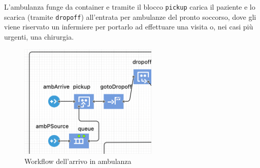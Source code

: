 L’ambulanza funge da container e  tramite il blocco \texttt{pickup} carica il paziente e lo scarica (tramite \texttt{dropoff}) all’entrata per ambulanze del pronto soccorso, dove gli viene riservato un infermiere per portarlo ad effettuare una visita o, nei casi più urgenti, una chirurgia.

\begin{figure}[!h]
    \centering
    \includegraphics[width=250px]{Immagini/workflow/Ambulance.png} 
    \caption{Workflow dell'arrivo in ambulanza}
\end{figure}



